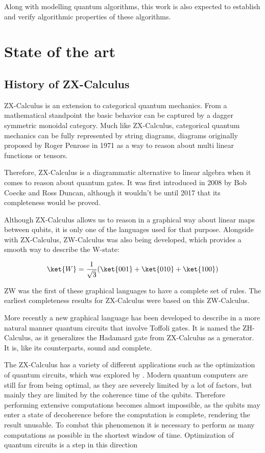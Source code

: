 Along with modelling quantum algorithms, this work is also expected to establish and verify algorithmic properties of these algorithms.

\section{State of the art}


\subsection{History of ZX-Calculus}

ZX-Calculus is an extension to categorical quantum mechanics. From a mathematical standpoint the basic behavior can be captured by a dagger symmetric monoidal category. Much like ZX-Calculus, categorical quantum mechanics can be fully represented by string diagrams, diagrams originally proposed by Roger Penrose in 1971 as a way to reason about multi linear functions or tensors.

 Therefore, ZX-Calculus is a diagrammatic alternative to linear algebra when it comes to reason about quantum gates. It was first introduced in 2008 by Bob Coecke and Ross Duncan, although it wouldn't be until 2017 that its completeness would be proved.

Although ZX-Calculus allows us to reason in a graphical way about linear maps between qubits, it is only one of the languages used for that purpose. Alongside with ZX-Calculus, ZW-Calculus was also being developed, which provides a smooth way to describe the W-state:

\begin{equation}
    \ket{W} = \frac{1}{\sqrt{3}}(\ket{001} + \ket{010} + \ket{100})
\end{equation}

ZW was the first of these graphical languages to have a complete set of rules. The earliest completeness results for ZX-Calculus were based on this ZW-Calculus.

More recently a new graphical language has been developed to describe in a more natural manner quantum circuits that involve Toffoli gates. It is named the ZH-Calculus, as it generalizes the Hadamard gate from ZX-Calculus as a generator. It is, like its counterparts, sound and complete.

The ZX-Calculus has a variety of different applications such as the optimization of quantum circuits, which was explored by \cite{Fagan_2019}. Modern quantum computers are still far from being optimal, as they are severely limited by a lot of factors, but mainly they are limited by the coherence time of the qubits. Therefore performing extensive computations becomes almost impossible, as the qubits may enter a state of decoherence before the computation is complete, rendering the result unusable. To combat this phenomenon it is necessary to perform as many computations as possible in the shortest window of time. Optimization of quantum circuits is a step in this direction

